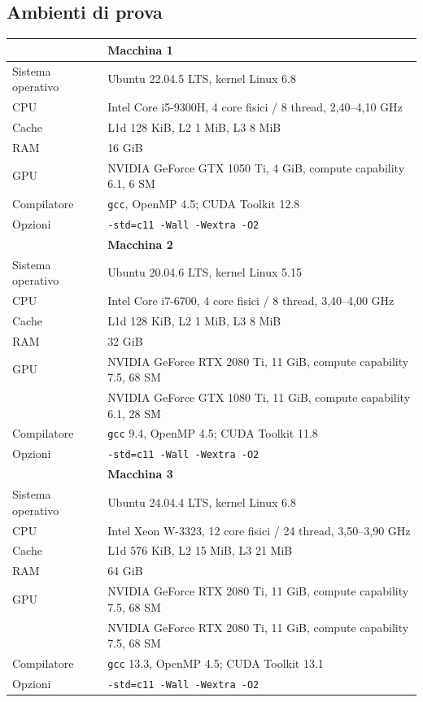 \documentclass[11pt,a4paper]{article}
\begin{document}
\subsection{Ambienti di prova}
\begin{center}
\begin{tabular}{@{}ll@{}}
\toprule
                  & \textbf{Macchina 1} \\
\midrule
Sistema operativo & Ubuntu 22.04.5 LTS, kernel Linux 6.8 \\
CPU               & Intel Core i5-9300H, 4 core fisici / 8 thread, 2,40--4,10 GHz \\
Cache             & L1d 128 KiB, L2 1 MiB, L3 8 MiB \\
RAM               & 16 GiB \\
GPU               & NVIDIA GeForce GTX 1050 Ti, 4 GiB, compute capability 6.1, 6 SM \\
Compilatore       & \texttt{gcc}, OpenMP 4.5; CUDA Toolkit 12.8 \\
Opzioni           & \texttt{-std=c11 -Wall -Wextra -O2} \\
\midrule
                  & \textbf{Macchina 2} \\
\midrule
Sistema operativo & Ubuntu 20.04.6 LTS, kernel Linux 5.15 \\
CPU               & Intel Core i7-6700, 4 core fisici / 8 thread, 3,40--4,00 GHz \\
Cache             & L1d 128 KiB, L2 1 MiB, L3 8 MiB \\
RAM               & 32 GiB \\
GPU               & NVIDIA GeForce RTX 2080 Ti, 11 GiB, compute capability 7.5, 68 SM \\
                  & NVIDIA GeForce GTX 1080 Ti, 11 GiB, compute capability 6.1, 28 SM \\
Compilatore       & \texttt{gcc} 9.4, OpenMP 4.5; CUDA Toolkit 11.8 \\
Opzioni           & \texttt{-std=c11 -Wall -Wextra -O2} \\
\midrule
                  & \textbf{Macchina 3} \\
\midrule
Sistema operativo & Ubuntu 24.04.4 LTS, kernel Linux 6.8 \\
CPU               & Intel Xeon W-3323, 12 core fisici / 24 thread, 3,50--3,90 GHz \\
Cache             & L1d 576 KiB, L2 15 MiB, L3 21 MiB \\
RAM               & 64 GiB \\
GPU               & NVIDIA GeForce RTX 2080 Ti, 11 GiB, compute capability 7.5, 68 SM \\
                  & NVIDIA GeForce RTX 2080 Ti, 11 GiB, compute capability 7.5, 68 SM \\
Compilatore       & \texttt{gcc} 13.3, OpenMP 4.5; CUDA Toolkit 13.1 \\
Opzioni           & \texttt{-std=c11 -Wall -Wextra -O2} \\
\bottomrule
\end{tabular}
\end{center}
\end{document}
